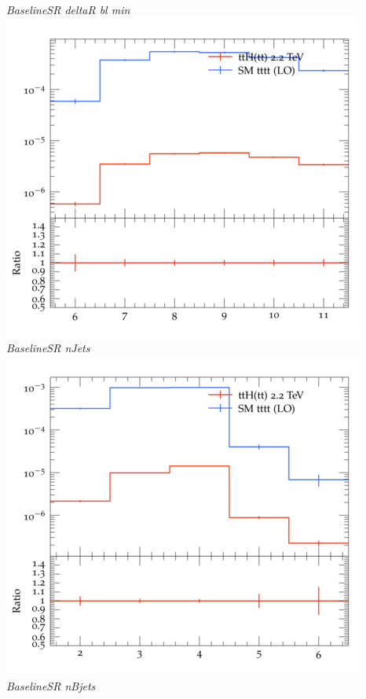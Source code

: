 \documentclass{beamer}
\begin{document}
\begin{frame}
\begin{columns}
\textit{\small BaselineSR deltaR bl min}
\includegraphics[width=\textwidth]{../plots/ttH_2200/tttt_ttH_1LOS/BaselineSR_nJets.png}\\
\textit{\small BaselineSR nJets}
\includegraphics[width=\textwidth]{../plots/ttH_2200/tttt_ttH_1LOS/BaselineSR_nBjets.png}\\
\textit{\small BaselineSR nBjets}
\end{columns}
\end{frame}
\end{document}
